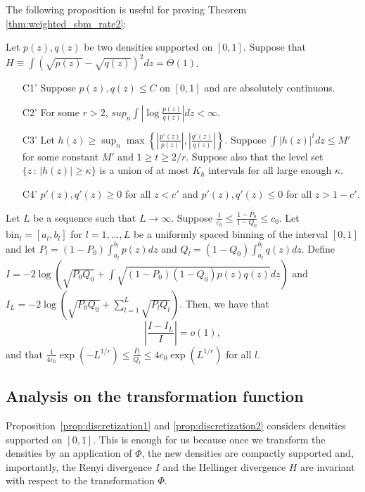 \documentclass{article}
\newcommand{\bin}{\text{bin}}
\begin{document}
\noindent The following proposition is useful for proving Theorem \ref{thm:weighted_sbm_rate2}:

\begin{proposition}
\label{prop:discretization2}
Let $p(z), q(z)$ be two densities supported on $[0,1]$. Suppose that $H \equiv \int (\sqrt{p(z)} - \sqrt{q(z)})^2 dz = \Theta(1)$.
\begin{enumerate}
\item[C1'] Suppose $p(z), q(z) \leq C$ on $[0,1]$ and are absolutely continuous.
\item[C2'] For some $r > 2$, $sup_n \int \left| \log \frac{p(z)}{q(z)} \right| dz < \infty$.
\item[C3'] Let $h(z) \geq \sup_n \max \left\{  \left|\frac{p'(z)}{p(z)} \right|, 
 \left|\frac{q'(z)}{q(z)}\right|  \right\} $. Suppose $\int |h(z)|^t dz \leq M'$ for some constant $M'$ and $1 \geq t \geq 2/r$. Suppose also that the level set $\{z \,:\, |h(z)| \geq \kappa\}$ is a union of at most $K_h$ intervals for all large enough $\kappa$.  
\item[C4']  $p'(z), q'(z) \geq 0$ for all $z < c'$ and $p'(z), q'(z) \leq 0$ for all $z > 1-c'$. 
\end{enumerate}
Let $L$ be a sequence such that $L \rightarrow \infty$. Suppose $\frac{1}{c_0} \leq \frac{1 - P_0}{1-Q_0} \leq c_0$. Let $\bin_l = [a_l, b_l]$ for $l=1,...,L$ be a uniformly spaced binning of the interval $[0,1]$ and let $P_l = (1- P_0) \int_{a_l}^{b_l} p(z) dz$ and $Q_l = (1-Q_0)\int_{a_l}^{b_l} q(z) dz$. Define $I = -2 \log \left( \sqrt{P_0 Q_0} + \int \sqrt{(1-P_0)(1-Q_0) p(z) q(z)} dz \right)$ and $I_L = -2 \log \left( \sqrt{P_0 Q_0} + \sum_{l=1}^L \sqrt{P_l Q_l} \right)$. Then, we have that
 $$ \left| \frac{I - I_L}{I} \right| = o(1),$$ 
and that $\frac{1}{4c_0} \exp(-L^{1/r}) \leq \frac{P_l}{Q_l} \leq 4 c_0 \exp(L^{1/r})$ for all $l$. 
\end{proposition}


\subsection{Analysis on the transformation function}
\label{sec:transformation_analysis}

Proposition~\ref{prop:discretization1} and \ref{prop:discretization2} considers densities supported on $[0,1]$. This is enough for us because once we transform the densities by an application of $\Phi$, the new densities are compactly supported and, importantly, the Renyi divergence $I$ and the Hellinger divergence $H$ are invariant with respect to the transformation $\Phi$.
\end{document}
